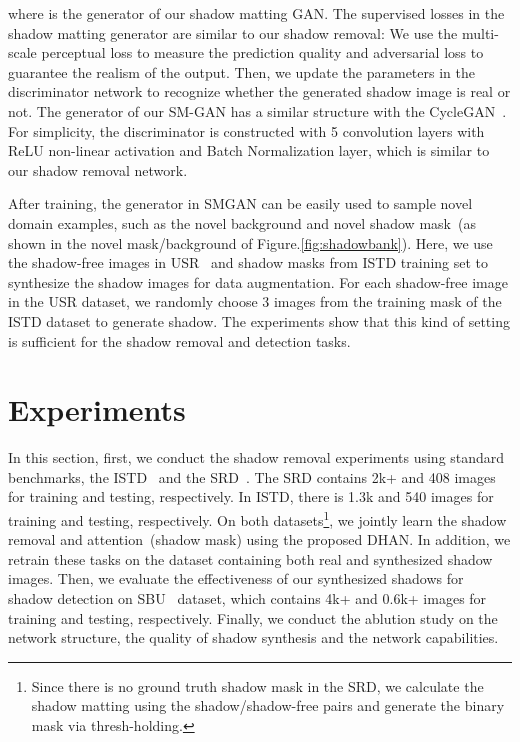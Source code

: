 \documentclass[letterpaper]{article} \usepackage{aaai20}  \usepackage{times}  \usepackage{helvet} \usepackage{courier}  \usepackage[hyphens]{url}  \urlstyle{rm} \def\UrlFont{\rm}  \usepackage{graphicx}  \frenchspacing  \setlength{\pdfpagewidth}{8.5in}  \setlength{\pdfpageheight}{11in}  \usepackage{amssymb}
\begin{document}
where  is the generator of our shadow matting GAN. The supervised losses in the shadow matting generator are similar to our shadow removal: We use the multi-scale perceptual loss to measure the prediction quality and adversarial loss to guarantee the realism of the output.
Then, we update the parameters in the discriminator network  to recognize whether the generated shadow image is real or not. The generator of our SM-GAN has a similar structure with the CycleGAN~\cite{Zhu:2017ua}. 
For simplicity, the discriminator is constructed with 5 convolution layers with ReLU non-linear activation and Batch Normalization layer, which is  similar to our shadow removal network.



After training, the generator in SMGAN can be easily used to sample novel domain examples, such as the novel background and novel shadow mask~(as shown in the novel mask/background of Figure.\ref{fig:shadowbank}). 
Here, we use the shadow-free images in USR~\cite{Anonymous:XfCvZjhb} and shadow masks from ISTD training set to synthesize the shadow images for data augmentation. For each shadow-free image in the USR dataset, we randomly choose 3 images from the training mask of the ISTD dataset to generate shadow. The experiments show that this kind of setting is sufficient for the shadow removal and detection tasks. 

\section{Experiments}
In this section, first, we conduct the shadow removal experiments using  standard benchmarks, the ISTD~\cite{wang2018stacked} and the SRD~\cite{qu2017deshadownet}. The SRD contains 2k+ and 408 images for training and testing, respectively. In ISTD, there is 1.3k and 540 images  for training and testing, respectively. On both datasets\footnote{Since there is no ground truth shadow mask in the SRD, we calculate the shadow matting using the shadow/shadow-free pairs and generate the binary mask via thresh-holding.}, we jointly learn the shadow removal and attention~(shadow mask) using the proposed DHAN. In addition, we retrain these tasks on the dataset containing both real and synthesized shadow images. Then, we evaluate the effectiveness of our synthesized shadows for shadow detection on SBU~\cite{vicente2016large} dataset, which contains 4k+ and 0.6k+ images for training and testing, respectively. Finally, we conduct the ablution study on the network structure, the quality of shadow synthesis and the network capabilities. 
 
\end{document}
